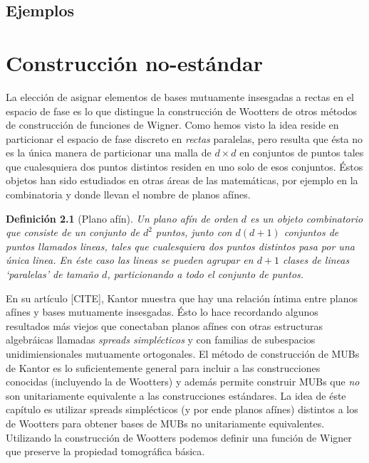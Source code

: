 \documentclass[a4paper]{report}
\newtheorem{definition}{Definición}
\begin{document}
  \section{Ejemplos}

  \chapter{Construcción no-estándar}

  La elección de asignar elementos de bases mutuamente
  insesgadas a rectas en el espacio de fase es lo
  que distingue la construcción de Wootters de otros métodos
  de construcción de funciones de Wigner. Como hemos visto
  la idea reside en particionar el espacio de fase discreto
  en \textit{rectas} paralelas, pero resulta que ésta no es la
  única manera de particionar una malla de $d \times d$ 
  en conjuntos de puntos tales que cualesquiera dos puntos
  distintos residen en uno solo de esos conjuntos. Éstos
  objetos han sido estudiados en otras áreas de las
  matemáticas, por ejemplo en la combinatoria y donde
  llevan el nombre de planos afínes. 

  \begin{definition}[Plano afín]
    Un plano afín de orden $d$ es un objeto combinatorio que
    consiste de un conjunto de $d^2$ puntos, junto con
    $d(d+1)$ conjuntos de puntos llamados \textit{lineas},
    tales que cualesquiera dos puntos distintos pasa por una
    única linea. En éste caso las lineas se pueden agrupar
    en $d+1$ clases de lineas `paralelas' de tamaño $d$,
    particionando a todo el conjunto de puntos. 
  \end{definition}

  En su artículo [CITE], Kantor muestra que hay una relación
  íntima entre planos afínes y bases mutuamente insesgadas.
  Ésto lo hace recordando algunos resultados más viejos que
  conectaban planos afínes con otras estructuras algebráicas
  llamadas \textit{spreads simplécticos} y con familias de
  subespacios unidimiensionales mutuamente ortogonales.
  El método de construcción de MUBs de Kantor es lo
  suficientemente general para incluir a las construcciones
  conocidas (incluyendo la de Wootters) y además permite
  construir MUBs que \textit{no} son unitariamente
  equivalente a las construcciones estándares. La idea de
  éste capítulo es utilizar spreads simplécticos (y por ende
  planos afínes) distintos a los de Wootters para obtener
  bases de MUBs no unitariamente equivalentes. Utilizando la
  construcción de Wootters podemos definir una función de
  Wigner que preserve la propiedad tomográfica básica. 
\end{document}
